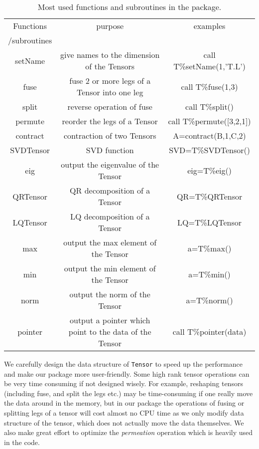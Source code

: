 \documentclass[preprint,3p,times,preprint,showpacs,amsmath,superscriptaddress,floatfix]{elsarticle}
\begin{document}
\begin{table} [h]
\begin{center}
\caption{Most used functions and subroutines in the  package.}
\begin{tabular}{ |c |  c| c|}
\hline
Functions & purpose &examples\\
/subroutines &  & \\
\hline
\hline
setName & give names to the dimension of the Tensors& call T\%setName(1,'T.L') \\
\hline
fuse & fuse 2 or more legs of a Tensor into one leg& call T\%fuse(1,3)\\
\hline
split& reverse  operation of fuse& call T\%split()\\
\hline
permute & reorder the legs of a Tensor& call T\%permute([3,2,1])\\
\hline
contract & contraction of two Tensors &A=contract(B,1,C,2)\\
\hline
SVDTensor & SVD function&SVD=T\%SVDTensor() \\
\hline
eig & output the eigenvalue of the Tensor& eig=T\%eig() \\
\hline
QRTensor & QR decomposition of a Tensor &QR=T\%QRTensor\\
\hline
LQTensor & LQ decomposition of a Tensor &LQ=T\%LQTensor \\
\hline
max & output the max element of the Tensor& a=T\%max() \\
\hline
min & output the min element of the Tensor&a=T\%min() \\
\hline
norm & output the norm of the Tensor&a=T\%norm() \\
\hline
pointer & output a pointer which point to the data of the Tensor&call T\%pointer(data) \\
\hline
\end{tabular}
\end{center}
\label{tab:functions}
 \end{table}


We carefully design the data structure of {\tt Tensor} to speed up the performance and make our package more user-friendly. Some high rank tensor operations can be very time consuming if not designed wisely. For example, reshaping tensors (including fuse, and split the legs etc.)
may be time-consuming if one really move the data around in the memory, but in our package the operations of fusing or splitting legs of a tensor will cost almost no CPU time as we only modify data structure of the tensor, which does not actually move the data themselves.
We also make great effort to optimize the {\it permeation} operation which is heavily used in the code.
\end{document}
